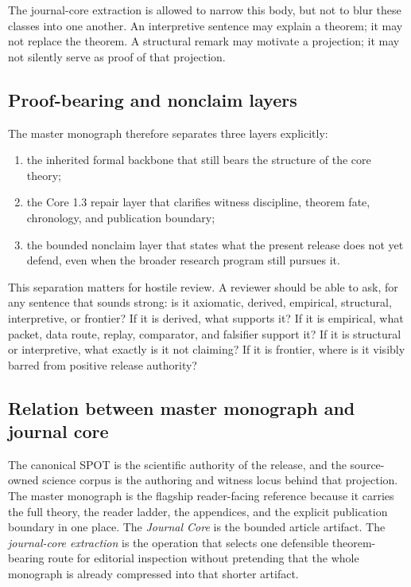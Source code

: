 The journal-core extraction is allowed to narrow this body, but not to blur
these classes into one another.
An interpretive sentence may explain a theorem; it may not replace the theorem.
A structural remark may motivate a projection; it may not silently serve as
proof of that projection.

\subsection{Proof-bearing and nonclaim layers}

The master monograph therefore separates three layers explicitly:

\begin{enumerate}
\item the inherited formal backbone that still bears the structure of the core
      theory;
\item the Core 1.3 repair layer that clarifies witness discipline, theorem
      fate, chronology, and publication boundary;
\item the bounded nonclaim layer that states what the present release does not
      yet defend, even when the broader research program still pursues it.
\end{enumerate}

This separation matters for hostile review.
A reviewer should be able to ask, for any sentence that sounds strong:
is it axiomatic, derived, empirical, structural, interpretive, or frontier?
If it is derived, what supports it?
If it is empirical, what packet, data route, replay, comparator, and falsifier
support it?
If it is structural or interpretive, what exactly is it not claiming?
If it is frontier, where is it visibly barred from positive release authority?

\subsection{Relation between master monograph and journal core}

The canonical SPOT is the scientific authority of the release, and the
source-owned science corpus is the authoring and witness locus behind that
projection. The master monograph is the flagship reader-facing reference
because it carries the full theory, the reader ladder, the appendices, and the
explicit publication boundary in one place.
The \emph{Journal Core} is the bounded article artifact. The
\emph{journal-core extraction} is the operation that selects one defensible
theorem-bearing route for editorial inspection without pretending that the
whole monograph is already compressed into that shorter artifact.

